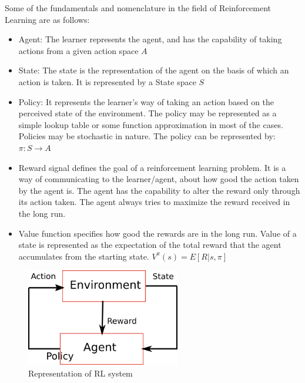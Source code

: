 \documentclass[hidelinks,BTech]{iitmdiss}
\begin{document}
Some of the fundamentals and nomenclature in the field of Reinforcement Learning are as follows:
\begin{itemize}
\item{Agent: The learner represents the agent, and has the capability of taking actions from a given action space $A$}
\item{State: The state is the representation of the agent on the basis of which an action is taken. It is represented by a State space $S$}
\item{Policy: It represents the learner's way of taking an action based on the perceived state of the environment. The policy may be represented as a simple lookup table or some function approximation in most of the cases. Policies may be stochastic in nature.
The policy can be represented by: $\pi: S\rightarrow A$}

\item{Reward signal defines the goal of a reinforcement learning problem. It is a way of communicating to the learner/agent, about how good the action taken by the agent is. The agent has the capability to alter the reward only through its action taken. The agent always tries to maximize the reward received in the long run.}
\item{Value function specifies how good the rewards are in the long run. Value of a state is represented as the expectation of the total reward that the agent accumulates from the starting state.  $V^{\pi} (s) = E[R|s,\pi]$}
\end{itemize}

\begin{figure}[H]
  \centering
    \includegraphics[width=0.6\textwidth]{RL.png}
    \caption{Representation of RL system}
\end{figure}
\end{document}

